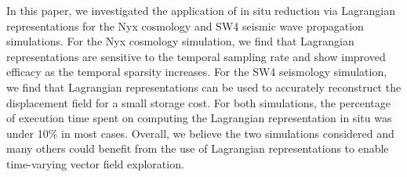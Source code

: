 In this paper, we investigated the application of in situ reduction via Lagrangian representations for the Nyx cosmology and SW4 seismic wave propagation simulations.
%
For the Nyx cosmology simulation, we find that Lagrangian representations are sensitive to the temporal sampling rate and show improved efficacy as the temporal sparsity increases.
%
For the SW4 seismology simulation, we find that Lagrangian representations can be used to accurately reconstruct the displacement field for a small storage cost.
%
For both simulations, the percentage of execution time spent on computing the Lagrangian representation in situ was under 10\% in most cases.
%
Overall, we believe the two simulations considered and many others could benefit from the use of Lagrangian representations to enable time-varying vector field exploration. 
